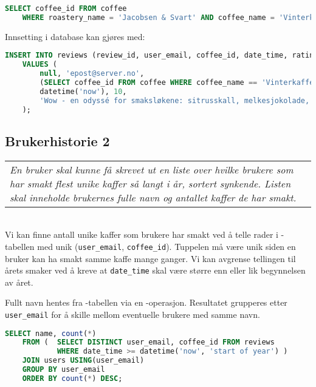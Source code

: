 \begin{lstlisting}[language=SQL]
    SELECT coffee_id FROM coffee
    WHERE roastery_name = 'Jacobsen & Svart' AND coffee_name = 'Vinterkaffe 2022';
\end{lstlisting}

Innsetting i database kan gjøres med: \\

\begin{lstlisting}[language=SQL]
    INSERT INTO reviews (review_id, user_email, coffee_id, date_time, rating, note)
    VALUES (
        null, 'epost@server.no',
        (SELECT coffee_id FROM coffee WHERE coffee_name == 'Vinterkaffe 2022'),
        datetime('now'), 10,
        'Wow - en odyssé for smaksløkene: sitrusskall, melkesjokolade, aprikos!'
    );
\end{lstlisting}

\subsection{Brukerhistorie 2}

\begin{tabular}{ | p{} }
    \textsl{En bruker skal kunne få skrevet ut en liste over hvilke brukere som har smakt flest unike kaffer så langt i år, sortert synkende.
    Listen skal inneholde brukernes fulle navn og antallet kaffer de har smakt.}
\end{tabular} \\

Vi kan finne antall unike kaffer som brukere har smakt ved å telle rader i -tabellen med unik (\verb|user_email|, \verb|coffee_id|).
Tuppelen må være unik siden en bruker kan ha smakt samme kaffe mange ganger.
Vi kan avgrense tellingen til årets smaker ved å kreve at \verb|date_time| skal være større enn eller lik begynnelsen av året.

Fullt navn hentes fra -tabellen via en -operasjon.
Resultatet grupperes etter \verb|user_email| for å skille mellom eventuelle brukere med samme navn. \\

\begin{lstlisting}[language=SQL]
    SELECT name, count(*)
    FROM (  SELECT DISTINCT user_email, coffee_id FROM reviews
            WHERE date_time >= datetime('now', 'start of year') )
    JOIN users USING(user_email)
    GROUP BY user_email
    ORDER BY count(*) DESC;
    
\end{lstlisting}

